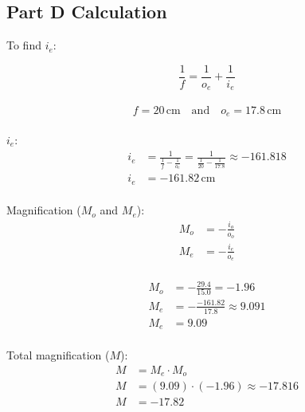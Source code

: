 \documentclass[a4paper,11pt]{article}
\begin{document}
\subsection*{Part D Calculation}
To find \( i_e \):

\begin{equation*}
\frac{1}{f} = \frac{1}{o_e} + \frac{1}{i_e}
\end{equation*}
\\
\begin{equation*}
f = 20 \, \text{cm} \quad \text{and} \quad o_e = 17.8 \, \text{cm}
\end{equation*}
\\
 \( i_e \):
\begin{align*}
i_e &= \frac{1}{\frac{1}{f} - \frac{1}{o_e}} = \frac{1}{\frac{1}{20} - \frac{1}{17.8}} \approx -161.818\\
i_e &= -161.82 \, \text{cm}
\end{align*}
\\
Magnification (\( M_o \) and \( M_e \)):
\\
\begin{align*}
M_o &= -\frac{i_o}{o_o} \\
M_e &= -\frac{i_e}{o_e}
\end{align*}
\\
\begin{align*}
M_o &= -\frac{29.4}{15.0} = -1.96 \\
M_e &= -\frac{ -161.82}{17.8} \approx 9.091\\
M_e &= 9.09
\end{align*}
\\
Total magnification (\( M \)):
\begin{align*}
M &= M_e \cdot M_o\\
M &= (9.09) \cdot (-1.96) \approx -17.816\\
M &= -17.82
\end{align*}
\end{document}
